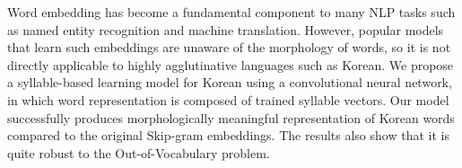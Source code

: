 Word embedding has become a fundamental component to many NLP tasks such as named entity recognition and machine translation. However, popular models that learn such embeddings are unaware of the morphology of words, so it is not directly applicable to highly agglutinative languages such as Korean. We propose a syllable-based learning model for Korean using a convolutional neural network, in which word representation is composed of trained syllable vectors. Our model successfully produces morphologically meaningful representation of Korean words compared to the original Skip-gram embeddings. The results also show that it is quite robust to the Out-of-Vocabulary problem.
